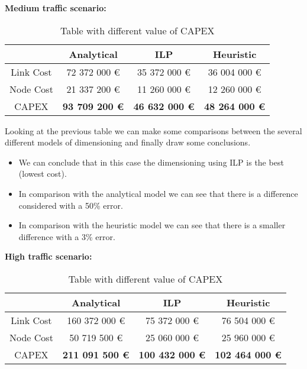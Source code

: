 \vspace{11pt}
\textbf{Medium traffic scenario:}

\begin{table}[h!]
\centering
\begin{tabular}{| c | c | c | c |}
 \hline
   & Analytical & ILP & Heuristic \\
 \hline\hline
 Link Cost & 72 372 000 \euro & 35 372 000 \euro & 36 004 000 \euro \\
 Node Cost & 21 337 200 \euro & 11 260 000 \euro & 12 260 000 \euro \\
 CAPEX & \textbf{93 709 200 \euro} & \textbf{46 632 000 \euro} & \textbf{48 264 000 \euro} \\
 \hline
\end{tabular}
\caption{Table with different value of CAPEX }
\label{table_comparative_opaque_sur_ref_2}
\end{table}

\vspace{11pt}
Looking at the previous table we can make some comparisons between the several different models of dimensioning and finally draw some conclusions.

\begin{itemize}
  \item We can conclude that in this case the dimensioning using ILP is the best (lowest cost).
  \item In comparison with the analytical model we can see that there is a difference considered with a 50\% error.
  \item In comparison with the heuristic model we can see that there is a smaller difference with a 3\% error.
\end{itemize}


\vspace{11pt}
\textbf{High traffic scenario:}\\

\begin{table}[h!]
\centering
\begin{tabular}{| c | c | c | c |}
 \hline
   & Analytical & ILP & Heuristic \\
 \hline\hline
 Link Cost & 160 372 000 \euro & 75 372 000 \euro & 76 504 000 \euro \\
 Node Cost & 50 719 500 \euro & 25 060 000 \euro & 25 960 000 \euro \\
 CAPEX & \textbf{211 091 500 \euro} & \textbf{100 432 000 \euro} & \textbf{102 464 000 \euro} \\
 \hline
\end{tabular}
\caption{Table with different value of CAPEX }
\label{table_comparative_opaque_sur_ref_3}
\end{table}


